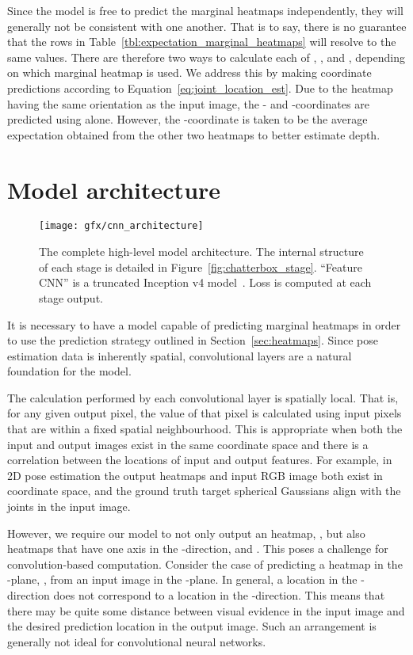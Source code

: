 \documentclass[australian,10pt,twocolumn,letterpaper,twocolumn]{article}
\begin{document}
Since the model is free to predict the marginal heatmaps independently,
they will generally not be consistent with one another. That is to
say, there is no guarantee that the rows in Table~\ref{tbl:expectation_marginal_heatmaps}
will resolve to the same values. There are therefore two ways to calculate
each of , ,
and , depending on which marginal heatmap
is used. We address this by making coordinate predictions according
to Equation~\ref{eq:joint_location_est}. Due to the  heatmap
having the same orientation as the input image, the - and -coordinates
are predicted using  alone. However, the -coordinate
is taken to be the average expectation obtained from the other two
heatmaps to better estimate depth.



\section{Model architecture}

\begin{figure*}
\begin{centering}
\texttt{[image: gfx/cnn\_architecture]}
\par\end{centering}
\caption{\label{fig:complete-model}The complete high-level model architecture.
The internal structure of each stage is detailed in Figure~\ref{fig:chatterbox_stage}.
``Feature CNN'' is a truncated Inception v4 model~\citep{szegedy2017inception}.
Loss is computed at each stage output.}
\end{figure*}
It is necessary to have a model capable of predicting marginal heatmaps
in order to use the prediction strategy outlined in Section~\ref{sec:heatmaps}.
Since pose estimation data is inherently spatial, convolutional layers
are a natural foundation for the model.

The calculation performed by each convolutional layer is spatially
local. That is, for any given output pixel, the value of that pixel
is calculated using input pixels that are within a fixed spatial neighbourhood.
This is appropriate when both the input and output images exist in
the same coordinate space and there is a correlation between the locations
of input and output features. For example, in 2D pose estimation the
output heatmaps and input RGB image both exist in  coordinate
space, and the ground truth target spherical Gaussians align with
the joints in the input image. 

However, we require our model to not only output an  heatmap,
, but also heatmaps that have one axis in the
-direction,  and .
This poses a challenge for convolution-based computation. Consider
the case of predicting a heatmap in the -plane, ,
from an input image in the -plane. In general, a location in
the -direction does not correspond to a location in the -direction.
This means that there may be quite some distance between visual evidence
in the input image and the desired prediction location in the output
image. Such an arrangement is generally not ideal for convolutional
neural networks.
\end{document}
